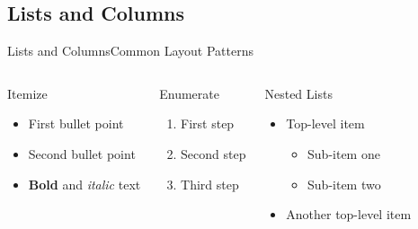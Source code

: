 \documentclass[
11pt,hyperref={pdfauthor=whatever}
]{beamer}
\begin{document}
\subsection{Lists and Columns}
\begin{frame}{Lists and Columns}{Common Layout Patterns}
\begin{columns}[T,onlytextwidth]
    \begin{block}{Itemize}
        \begin{itemize}
            \item First bullet point
            \item Second bullet point
            \item \textbf{Bold} and \textit{italic} text
        \end{itemize}
    \end{block}

    \begin{block}{Enumerate}
        \begin{enumerate}
            \item First step
            \item Second step
            \item Third step
        \end{enumerate}
    \end{block}

    \begin{block}{Nested Lists}
        \begin{itemize}
            \item Top-level item
            \begin{itemize}
                \item Sub-item one
                \item Sub-item two
            \end{itemize}
            \item Another top-level item
        \end{itemize}
    \end{block}
\end{columns}

\end{frame}
\end{document}
